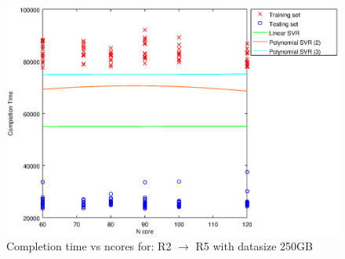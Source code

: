 
\begin {figure}[hbtp]
\centering
\includegraphics[width=\textwidth]{output/R2_R5_250_ALL_FEATURES/plot_R2_R5_250_bestmodels.eps}
\caption{Completion time vs ncores for: R2 $\rightarrow$ R5 with datasize 250GB}
\label{fig:coreonly_linear_R2_R5_250}
\end {figure}
